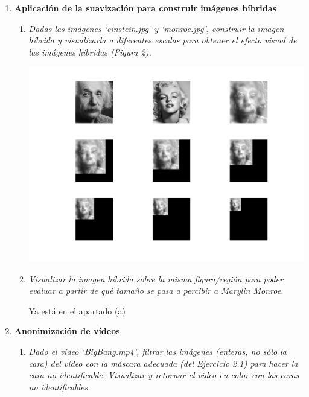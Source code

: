 \documentclass{article}
\begin{document}
\begin{enumerate}
\begin{enumerate}
\begin{enumerate}
 \end{enumerate}
 
  
  
 \end{enumerate}

\newpage

 \item \textbf{Aplicación  de  la  suavización  para  construir imágenes híbridas} 
 
 \begin{enumerate}
 \item \textit{Dadas  las  imágenes  ‘einstein.jpg’ y  ‘monroe.jpg’,  construir  la  imagen  híbrida  y 
visualizarla a diferentes escalas para  obtener el efecto  visual de las imágenes híbridas 
(Figura 2).}  
 
 \begin{center}
 \includegraphics[width=\textwidth]{4a.png}
 \end{center}

 \item \textit{Visualizar la imagen híbrida sobre la misma figura/región para poder evaluar a partir 
de qué tamaño se pasa a percibir a  Marylin Monroe.}

  Ya está en el apartado (a)

 \end{enumerate}

\newpage

 \item \textbf{Anonimización de vídeos}

 \begin{enumerate}
 \item \textit{Dado el vídeo ‘BigBang.mp4’, filtrar las imágenes (enteras, no sólo la cara) del vídeo con la máscara adecuada (del Ejercicio 2.1) para hacer la cara no identificable. Visualizar y retornar el vídeo en color con las caras no identificables.}
 

\end{enumerate}
\end{enumerate}
\end{document}
